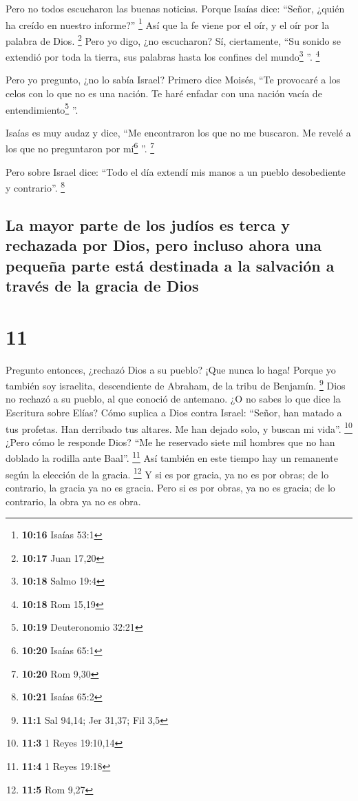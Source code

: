 Pero no todos escucharon las buenas noticias. Porque
Isaías dice: ``Señor, ¿quién ha creído en nuestro informe?'' \footnote{\textbf{10:16}
  Isaías 53:1}  Así que la fe viene por el oír, y el oír
por la palabra de Dios. \footnote{\textbf{10:17} Juan 17,20}
 Pero yo digo, ¿no escucharon? Sí, ciertamente, ``Su
sonido se extendió por toda la tierra, sus palabras hasta los confines
del mundo\footnote{\textbf{10:18} Salmo 19:4} ''. \footnote{\textbf{10:18}
  Rom 15,19}

 Pero yo pregunto, ¿no lo sabía Israel? Primero dice
Moisés, ``Te provocaré a los celos con lo que no es una nación. Te haré
enfadar con una nación vacía de entendimiento\footnote{\textbf{10:19}
  Deuteronomio 32:21} ''.

 Isaías es muy audaz y dice, ``Me encontraron los que no
me buscaron. Me revelé a los que no preguntaron por mí\footnote{\textbf{10:20}
  Isaías 65:1} ''. \footnote{\textbf{10:20} Rom 9,30}

 Pero sobre Israel dice: ``Todo el día extendí mis manos
a un pueblo desobediente y contrario''. \footnote{\textbf{10:21} Isaías
  65:2}

\hypertarget{la-mayor-parte-de-los-juduxedos-es-terca-y-rechazada-por-dios-pero-incluso-ahora-una-pequeuxf1a-parte-estuxe1-destinada-a-la-salvaciuxf3n-a-travuxe9s-de-la-gracia-de-dios}{%
\subsection{La mayor parte de los judíos es terca y rechazada por Dios,
pero incluso ahora una pequeña parte está destinada a la salvación a
través de la gracia de
Dios}\label{la-mayor-parte-de-los-juduxedos-es-terca-y-rechazada-por-dios-pero-incluso-ahora-una-pequeuxf1a-parte-estuxe1-destinada-a-la-salvaciuxf3n-a-travuxe9s-de-la-gracia-de-dios}}

\hypertarget{section-10}{%
\section{11}\label{section-10}}

 Pregunto entonces, ¿rechazó Dios a su pueblo? ¡Que nunca
lo haga! Porque yo también soy israelita, descendiente de Abraham, de la
tribu de Benjamín. \footnote{\textbf{11:1} Sal 94,14; Jer 31,37; Fil 3,5}
 Dios no rechazó a su pueblo, al que conoció de antemano.
¿O no sabes lo que dice la Escritura sobre Elías? Cómo suplica a Dios
contra Israel:  ``Señor, han matado a tus profetas. Han
derribado tus altares. Me han dejado solo, y buscan mi vida''.
\footnote{\textbf{11:3} 1 Reyes 19:10,14}  ¿Pero cómo le
responde Dios? ``Me he reservado siete mil hombres que no han doblado la
rodilla ante Baal''. \footnote{\textbf{11:4} 1 Reyes 19:18}
 Así también en este tiempo hay un remanente según la
elección de la gracia. \footnote{\textbf{11:5} Rom 9,27} 
Y si es por gracia, ya no es por obras; de lo contrario, la gracia ya no
es gracia. Pero si es por obras, ya no es gracia; de lo contrario, la
obra ya no es obra.

